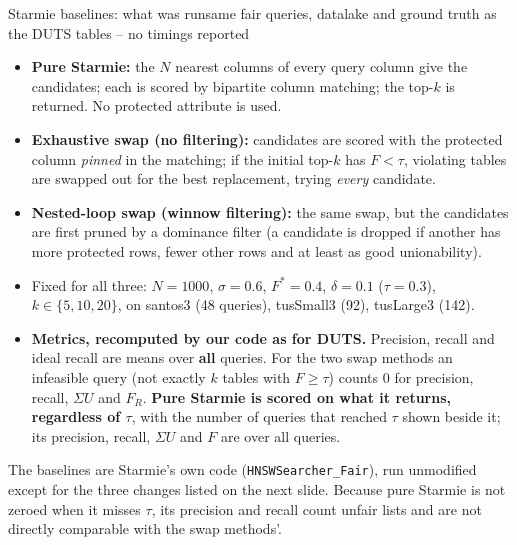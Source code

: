 \documentclass[aspectratio=169,10pt]{beamer}
\newcommand{\highlight}[1]{{\color{Cat1}\bfseries #1}}
\begin{document}
\begin{frame}{Starmie baselines: what was run}{same fair queries, datalake and ground truth as the DUTS tables -- no timings reported}
\footnotesize
\begin{itemize}\setlength\itemsep{3pt}
\item \highlight{Pure Starmie:} the $N$ nearest columns of every query column give the candidates; each is scored by bipartite column matching; the top-$k$ is returned. No protected attribute is used.
\item \highlight{Exhaustive swap (no filtering):} candidates are scored with the protected column \emph{pinned} in the matching; if the initial top-$k$ has $F<\tau$, violating tables are swapped out for the best replacement, trying \emph{every} candidate.
\item \highlight{Nested-loop swap (winnow filtering):} the same swap, but the candidates are first pruned by a dominance filter (a candidate is dropped if another has more protected rows, fewer other rows and at least as good unionability).
\item Fixed for all three: $N{=}1000$, $\sigma{=}0.6$, $F^*{=}0.4$, $\delta{=}0.1$ ($\tau{=}0.3$), $k\in\{5,10,20\}$, on santos3 (48 queries), tusSmall3 (92), tusLarge3 (142).
\item \textbf{Metrics, recomputed by our code as for DUTS.} Precision, recall and ideal recall are means over \textbf{all} queries. For the two swap methods an infeasible query (not exactly $k$ tables with $F\ge\tau$) counts 0 for precision, recall, $\Sigma U$ and $F_R$. \textbf{Pure Starmie is scored on what it returns, regardless of $\tau$}, with the number of queries that reached $\tau$ shown beside it; its precision, recall, $\Sigma U$ and $F$ are over all queries.
\end{itemize}
{\footnotesize\color{Muted} The baselines are Starmie's own code (\texttt{HNSWSearcher\_Fair}), run unmodified except for the three changes listed on the next slide. Because pure Starmie is not zeroed when it misses $\tau$, its precision and recall count unfair lists and are not directly comparable with the swap methods'.}
\end{frame}
\end{document}
